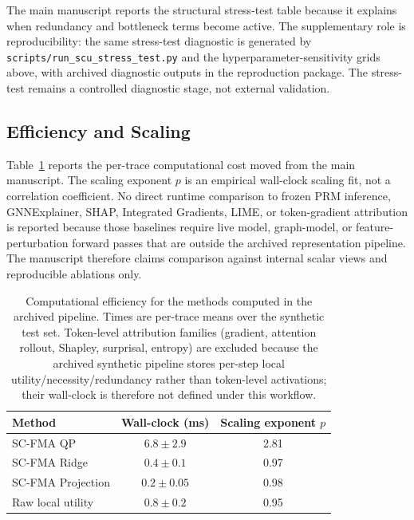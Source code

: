 \documentclass[pdflatex,sn-mathphys-num]{sn-jnl}
\begin{document}
The main manuscript reports the structural stress-test table because it explains when redundancy and bottleneck terms become active. The supplementary role is reproducibility: the same stress-test diagnostic is generated by \texttt{scripts/run\_scu\_stress\_test.py} and the hyperparameter-sensitivity grids above, with archived diagnostic outputs in the reproduction package. The stress-test remains a controlled diagnostic stage, not external validation.

\subsection{Efficiency and Scaling}
\label{app:efficiency-scaling}

Table~\ref{tab:supp-efficiency} reports the per-trace computational cost moved from the main manuscript. The scaling exponent $p$ is an empirical wall-clock scaling fit, not a correlation coefficient. No direct runtime comparison to frozen PRM inference, GNNExplainer, SHAP, Integrated Gradients, LIME, or token-gradient attribution is reported because those baselines require live model, graph-model, or feature-perturbation forward passes that are outside the archived representation pipeline. The manuscript therefore claims comparison against internal scalar views and reproducible ablations only.

\begin{table}[ht]
\caption{Computational efficiency for the methods computed in the archived pipeline. Times are per-trace means over the synthetic test set. Token-level attribution families (gradient, attention rollout, Shapley, surprisal, entropy) are excluded because the archived synthetic pipeline stores per-step local utility/necessity/redundancy rather than token-level activations; their wall-clock is therefore not defined under this workflow.}
\label{tab:supp-efficiency}
\centering
\small
\begin{tabular}{lcc}
\toprule
\textbf{Method} & \textbf{Wall-clock (ms)} & \textbf{Scaling exponent $p$} \\
\midrule
SC-FMA QP & $6.8 \pm 2.9$ & 2.81 \\
SC-FMA Ridge & $0.4 \pm 0.1$ & 0.97 \\
SC-FMA Projection & $0.2 \pm 0.05$ & 0.98 \\
Raw local utility & $0.8 \pm 0.2$ & 0.95 \\
\bottomrule
\end{tabular}
\end{table}
\end{document}
